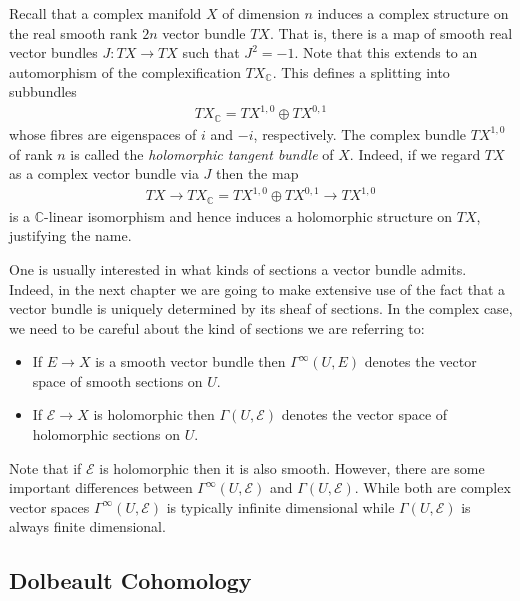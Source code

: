 \documentclass[12pt]{ociamthesis}  %
\begin{document}
\begin{example}
  Recall that a complex manifold $X$ of dimension $n$ induces a
  complex structure on the real smooth rank $2n$ vector bundle $TX$.
  That is, there is a map of smooth real vector bundles
  $J : TX \to TX$ such that $J^2 = -1$. Note that this extends to
  an automorphism of the complexification $TX_{\mathbb{C}}$.
  This defines a splitting into subbundles
  \begin{align}\label{eq:tangent_decomposition}
    TX_{\mathbb{C}}  = TX^{1,0} \oplus TX^{0,1}
  \end{align}
  whose fibres are eigenspaces of $i$ and $-i$, respectively. The
  complex bundle $TX^{1,0}$ of rank $n$ is called the
  \emph{holomorphic tangent bundle} of $X$. Indeed, if we regard $TX$
  as a complex vector bundle via $J$ then the map
  \begin{align}\label{eq:holomorphic_tangent_bundle}
    TX
    \longrightarrow TX_{\mathbb C}
    = TX^{1,0} \oplus TX^{0,1}
    \longrightarrow TX^{1,0}
  \end{align}
  is a $\mathbb{C}$-linear isomorphism and hence induces a holomorphic
  structure on $TX$, justifying the name.
\end{example}

One is usually interested in what kinds of sections a vector bundle
admits. Indeed, in the next chapter we are going to make extensive use
of the fact that a vector bundle is uniquely determined by its sheaf
of sections. In the complex case, we need to be careful about the
kind of sections we are referring to:

\begin{itemize}
  \item If $E\to X$ is a smooth vector bundle then $\Gamma^\infty(U,E)$
        denotes the vector space of smooth sections on $U$.
  \item If $\mathcal E\to X$ is holomorphic then $\Gamma(U,\mathcal E)$
        denotes the vector space of holomorphic sections on $U$.
\end{itemize}

Note that if $\mathcal E$ is holomorphic then it is also smooth.
However, there are some important differences between
$\Gamma^\infty(U,\mathcal E)$ and $\Gamma(U,\mathcal E)$. While both are
complex vector spaces $\Gamma^\infty(U,\mathcal E)$ is typically infinite
dimensional while $\Gamma(U,\mathcal E)$ is always finite
dimensional.~\cite[Theorem 1.4.1]{ma2007}

\subsection{Dolbeault Cohomology}
\missingcitation
\end{document}
